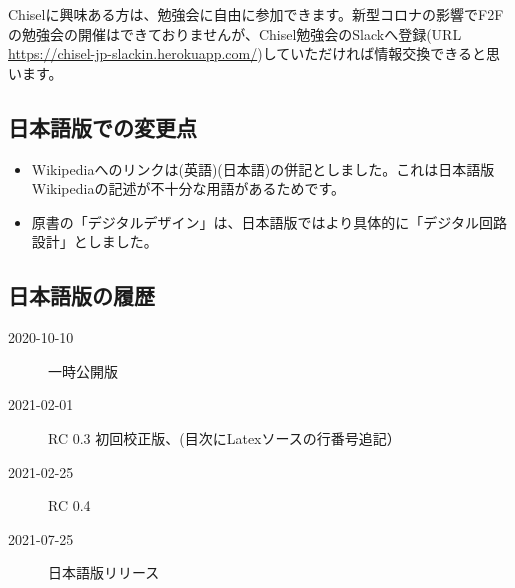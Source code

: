 \documentclass[%
    10pt,
    headinclude, footexclude,
    openright, %
    notitlepage,
    cleardoubleempty,
    headsepline,
    pointlessnumbers,
    bibtotoc, idxtotoc,
    ]{scrbook}
\newif\ifshoworiginal
\newif\ifshowtrans
\newcommand{\myref}[2]{\href{#1}{#2}}
\renewcommand{\myref}[2]{{#2}{\footnote{\url{#1}}}}
\begin{document}
\begin{flushleft}
Chiselに興味ある方は、勉強会に自由に参加できます。新型コロナの影響でF2Fの勉強会の開催はできておりませんが、Chisel勉強会のSlackへ登録(URL \url{https://chisel-jp-slackin.herokuapp.com/})していただければ情報交換できると思います。

\subsection*{日本語版での変更点}

\begin{itemize}
    \item Wikipediaへのリンクは(英語)(日本語)の併記としました。これは日本語版Wikipediaの記述が不十分な用語があるためです。
    \item 原書の「デジタルデザイン」は、日本語版ではより具体的に「デジタル回路設計」としました。
\end{itemize}

\subsection*{日本語版の履歴}

\begin{description}
\item[2020-10-10] 一時公開版
\item[2021-02-01] RC 0.3 初回校正版、(目次にLatexソースの行番号追記）
\item[2021-02-25] RC 0.4
\item[2021-07-25] 日本語版リリース 
\end{description}

\fi %

\mainmatter

\ifshoworiginal
\chapter{Introduction}
\fi
\ifshowtrans %
\chapter{はじめに} %
\fi

\label{sec:intro}

\ifshoworiginal
This book is an introduction to digital system design using a modern hardware
construction language, \myref{https://www.chisel-lang.org/}{Chisel}~\cite{chisel:dac2012}.
In this book, we focus on a higher abstraction level than usual in digital design books,
to enable you to build more complex, interacting digital systems in a shorter time.
\fi


\end{flushleft}
\end{document}
